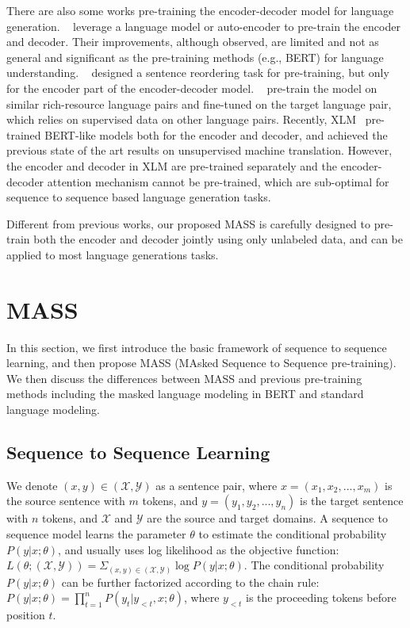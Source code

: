 \documentclass{article}
\begin{document}
	There are also some works pre-training the encoder-decoder model for language generation. ~\citet{dai2015semi,ramachandran2016unsupervised} leverage a language model or auto-encoder to pre-train the encoder and decoder. Their improvements, although observed, are limited and not as general and significant as the pre-training methods (e.g., BERT) for language understanding. ~\citet{zhang2016exploiting} designed a sentence reordering task for pre-training, but only for the encoder part of the encoder-decoder model. ~\citet{zoph2016transfer,firat2016zero} pre-train the model on similar rich-resource language pairs and fine-tuned on the target language pair, which relies on supervised data on other language pairs. Recently, XLM~\citep{Lample2019MLM} pre-trained BERT-like models both for the encoder and decoder, and achieved the previous state of the art results on unsupervised machine translation. However, the encoder and decoder in XLM are pre-trained separately and the encoder-decoder attention mechanism cannot be pre-trained, which are sub-optimal for sequence to sequence based language generation tasks.
	
	Different from previous works, our proposed MASS is carefully designed to pre-train both the encoder and decoder jointly using only unlabeled data, and can be applied to most language generations tasks.  
	
	\section{MASS}
	\label{sec_method}
	In this section, we first introduce the basic framework of sequence to sequence learning, and then propose MASS (MAsked Sequence to Sequence pre-training). We then discuss the differences between MASS and previous pre-training methods including the masked language modeling in BERT and standard language modeling.
	
	\subsection{Sequence to Sequence Learning}
	We denote $(x,y) \in \mathcal{(X,Y)}$ as a sentence pair, where $x=(x_1,x_2,...,x_m)$ is the source sentence with $m$ tokens, and $y=(y_1,y_2,...,y_n)$ is the target sentence with $n$ tokens, and $\mathcal{X}$ and $\mathcal{Y}$ are the source and target domains. A sequence to sequence model learns the parameter $\theta$ to estimate the conditional probability $P(y|x;\theta)$, and usually uses log likelihood as the objective function: $L(\theta; \mathcal{(X,Y)}) = \Sigma_{(x,y)\in \mathcal{\mathcal{(X,Y)}}}\log P(y|x;\theta)$. The conditional probability $P(y|x;\theta)$ can be further factorized according to the chain rule: $P(y|x;\theta) = \prod_{t=1}^{n} P(y_t | y_{<t}, x; \theta)$, where $y_{<t}$ is the proceeding tokens before position $t$. 
	
\end{document}
